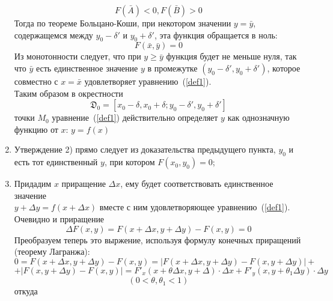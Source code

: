 \begin{enumerate}
    \begin{equation*}
        F(\bar{A}) < 0, F(\bar{B}) > 0
    \end{equation*}
    Тогда по теореме Больцано-Коши, при некотором значении $y = \bar{y}$, содержащемся между $y_0 - \delta'$ и $y_0 + \delta'$, эта функция обращается в ноль: 
    \begin{equation*}
        F(\bar{x}, \bar{y}) = 0
    \end{equation*}
    Из монотонности следует, что при  $y \geq \bar{y}$ функция будет не меньше нуля, так что $\bar{y}$ есть единственное значение $y$ в промежутке $(y_0 - \delta', y_0 + \delta')$, которое совместно с $x = \bar{x}$ удовлетворяет уравнению~(\ref{def1}).\\
    Таким образом в окрестности
    \begin{equation*}
        \mathfrak{D}_0 = [x_0 - \delta, x_0 + \delta; y_0 - \delta', y_0 + \delta']
    \end{equation*}
    точки $M_0$ уравнение~(\ref{def1}) действительно определяет $y$ как однозначную функцию от $x$: $y = f(x)$
    \item Утверждение 2) прямо следует из доказательства предыдущего пункта, $y_0$ и есть тот единственный $y$, при котором $F(x_0, y_0) = 0$;
    \item Придадим $x$ приращение $\Delta x$, ему будет соответствовать единственное значение \\$y + \Delta y = f(x + \Delta x)$ вместе с ним удовлетворяющее уравнению~(\ref{def1}). Очевидно и приращение 
    \begin{equation*}
        \Delta F(x, y) = F(x + \Delta x, y + \Delta y) - F(x, y)= 0
    \end{equation*}
    Преобразуем теперь это выржение, используя формулу конечных приращений (теорему Лагранжа):
    \begin{equation*}
        0 = F(x + \Delta x, y + \Delta y) - F(x, y) = |F(x + \Delta x, y + \Delta y) - F(x, y + \Delta y)| +
    \end{equation*}
    \begin{equation*}
        + |F(x, y + \Delta y) - F(x, y)| = F'_x(x + \theta \Delta x, y + \Delta )\cdot \Delta x + F'_y(x, y + \theta_1 \Delta y)\cdot\Delta y
    \end{equation*}
    \begin{equation*}
        (0 < \theta, \theta_1 < 1)
    \end{equation*}
    откуда
    \begin{equation}\label{eq2}

\end{equation}
\end{enumerate}
